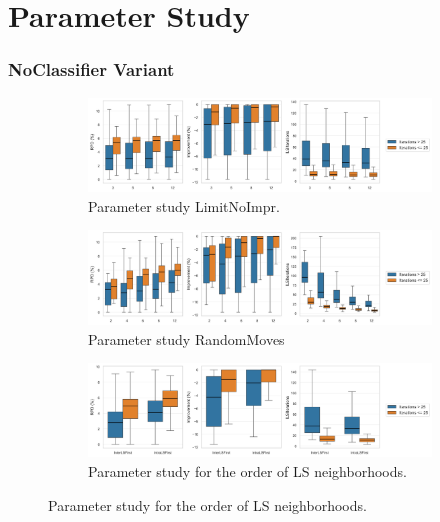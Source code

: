 \clearpage


\section{Parameter Study}

\subsubsection{NoClassifier Variant}
\label{app:subsec:parameterstudy_noclassifier}


\begin{figure}[!ht]
	\centering
	\begin{subfigure}[t]{0.83\textwidth}
		\centering
		\caption{Parameter study LimitNoImpr.}
		\includegraphics[width=\textwidth]{pictures/parameter_study/LimitNoImpr_base_parameter_study.png}
	\end{subfigure}
	\begin{subfigure}[t]{0.83\textwidth}
		\centering
		\caption{Parameter study RandomMoves}
		\includegraphics[width=\textwidth]{pictures/parameter_study/RandomMoves_base_parameter_study.png}
	\end{subfigure}
	\begin{subfigure}[t]{0.83\textwidth}
		\centering
		\caption{Parameter study for the order of LS neighborhoods.}
		\includegraphics[width=\textwidth]{pictures/parameter_study/LocalSearchTypes_base_parameter_study.png}

\end{subfigure}
\end{figure}
